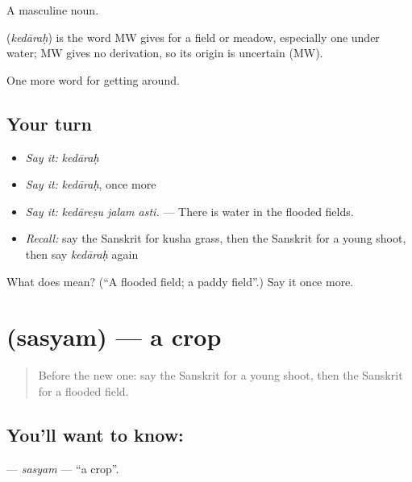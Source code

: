 A masculine noun.

\begin{cousinweb}
\textbf{} (\emph{kedāraḥ}) is the word MW gives for a field or meadow, especially one under water; MW gives no derivation, so its origin is uncertain (MW).
\end{cousinweb}

\begin{grammarlens}[title={What you've built}]
One more word for getting around.
\end{grammarlens}

\subsection*{Your turn}
\begin{itemize}
\raggedright
  \item \emph{Say it:} \emph{kedāraḥ}
  \item \emph{Say it:} \emph{kedāraḥ}, once more
  \item \emph{Say it:} \emph{kedāreṣu jalam asti.} — There is water in the flooded fields.
  \item \emph{Recall:} say the Sanskrit for kusha grass, then the Sanskrit for a young shoot, then say \emph{kedāraḥ} again
\end{itemize}

\begin{tcolorbox}[breakable,colback=teal!4,colframe=teal!35!black,title={Before you move on}]
What does  mean? (\textquotedblleft{}A flooded field; a paddy field\textquotedblright{}.) Say it once more.
\end{tcolorbox}
\section[\texorpdfstring{\sk{सस्यम्} (sasyam)}{सस्यम् (sasyam)}]{ (sasyam) — a crop}

\label{lesson:SA-C447-sasyam}



\begin{quote}
Before the new one: say the Sanskrit for a young shoot, then the Sanskrit for a flooded field.
\end{quote}

\subsection*{You'll want to know: }
\textbf{} — \emph{sasyam} — \textquotedblleft{}a crop\textquotedblright{}.

